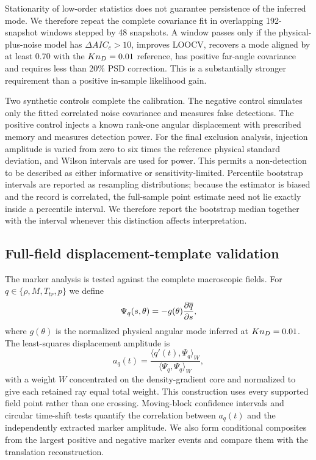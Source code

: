 Stationarity of low-order statistics does not guarantee persistence of the inferred mode. We therefore repeat the complete covariance fit in overlapping 192-snapshot windows stepped by 48 snapshots. A window passes only if the physical-plus-noise model has $\Delta AIC_c>10$, improves LOOCV, recovers a mode aligned by at least 0.70 with the $Kn_D=0.01$ reference, has positive far-angle covariance and requires less than 20\% PSD correction. This is a substantially stronger requirement than a positive in-sample likelihood gain.

Two synthetic controls complete the calibration. The negative control simulates only the fitted correlated noise covariance and measures false detections. The positive control injects a known rank-one angular displacement with prescribed memory and measures detection power. For the final exclusion analysis, injection amplitude is varied from zero to six times the reference physical standard deviation, and Wilson intervals are used for power. This permits a non-detection to be described as either informative or sensitivity-limited. Percentile bootstrap intervals are reported as resampling distributions; because the estimator is biased and the record is correlated, the full-sample point estimate need not lie exactly inside a percentile interval. We therefore report the bootstrap median together with the interval whenever this distinction affects interpretation.

\subsection{Full-field displacement-template validation}
The marker analysis is tested against the complete macroscopic fields. For $q\in\{\rho,M,T_{tr},p\}$ we define
\begin{equation}
 \Psi_q(s,\theta)=-g(\theta)\frac{\partial \overline{q}}{\partial s},
 \label{eq:template}
\end{equation}
where $g(\theta)$ is the normalized physical angular mode inferred at $Kn_D=0.01$. The least-squares displacement amplitude is
\begin{equation}
 a_q(t)=\frac{\langle q'(t),\Psi_q\rangle_W}{\langle \Psi_q,\Psi_q\rangle_W},
 \label{eq:amplitude}
\end{equation}
with a weight $W$ concentrated on the density-gradient core and normalized to give each retained ray equal total weight. This construction uses every supported field point rather than one crossing. Moving-block confidence intervals and circular time-shift tests quantify the correlation between $a_q(t)$ and the independently extracted marker amplitude. We also form conditional composites from the largest positive and negative marker events and compare them with the translation reconstruction.

